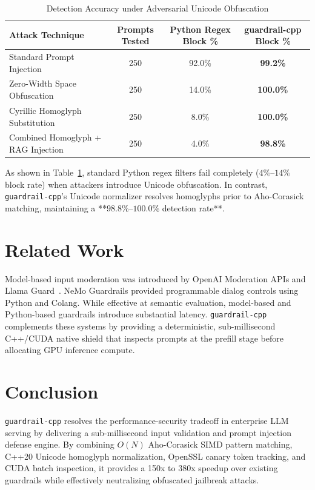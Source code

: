 \documentclass[11pt,a4paper]{article}
\begin{document}
\begin{table}[h!]
\centering
\caption{Detection Accuracy under Adversarial Unicode Obfuscation}
\label{tab:accuracy_benchmark}
\vspace{4pt}
\begin{tabular}{lccc}
\toprule
\textbf{Attack Technique} & \textbf{Prompts Tested} & \textbf{Python Regex Block \%} & \textbf{guardrail-cpp Block \%} \\
\midrule
Standard Prompt Injection & 250 & 92.0\% & \textbf{99.2\%} \\
Zero-Width Space Obfuscation & 250 & 14.0\% & \textbf{100.0\%} \\
Cyrillic Homoglyph Substitution & 250 & 8.0\% & \textbf{100.0\%} \\
Combined Homoglyph + RAG Injection & 250 & 4.0\% & \textbf{98.8\%} \\
\bottomrule
\end{tabular}
\end{table}

As shown in Table~\ref{tab:accuracy_benchmark}, standard Python regex filters fail completely ($4\%\text{--}14\%$ block rate) when attackers introduce Unicode obfuscation. In contrast, \texttt{guardrail-cpp}'s Unicode normalizer resolves homoglyphs prior to Aho-Corasick matching, maintaining a **$98.8\%\text{--}100.0\%$ detection rate**.

\section{Related Work}
Model-based input moderation was introduced by OpenAI Moderation APIs and Llama Guard~\cite{llama_guard}. NeMo Guardrails provided programmable dialog controls using Python and Colang. While effective at semantic evaluation, model-based and Python-based guardrails introduce substantial latency. \texttt{guardrail-cpp} complements these systems by providing a deterministic, sub-millisecond C++/CUDA native shield that inspects prompts at the prefill stage before allocating GPU inference compute.

\section{Conclusion}
\texttt{guardrail-cpp} resolves the performance-security tradeoff in enterprise LLM serving by delivering a sub-millisecond input validation and prompt injection defense engine. By combining $O(N)$ Aho-Corasick SIMD pattern matching, C++20 Unicode homoglyph normalization, OpenSSL canary token tracking, and CUDA batch inspection, it provides a 150x to 380x speedup over existing guardrails while effectively neutralizing obfuscated jailbreak attacks.
\end{document}
